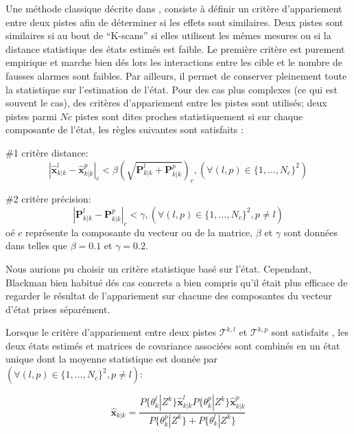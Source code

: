 \documentclass[10pt,french,a4paper]{report}
\begin{document}
Une méthode classique décrite dans \cite{Blackman1986}, consiste à définir un critère d'appariement entre deux pistes afin de déterminer si les effets sont similaires. Deux pistes sont similaires si au bout de ``K-scans'' si elles utilisent les mêmes mesures ou si la distance statistique des états estimés est faible. Le première critère est purement empirique et marche bien dés lors les interactions entre les cible et le nombre de fausses alarmes sont faibles. Par ailleurs, il permet de conserver pleinement toute la statistique sur l'estimation de l'état. Pour des cas plus complexes (ce qui est souvent le cas), des critères d'appariement entre les pistes sont utilisés; deux pistes parmi $Nc$ pistes sont dites proches statistiquement si sur chaque composante  de l'état, les règles suivantes sont satisfaits :
 
$\#$1 critère distance:
\begin{equation}  
 	  |\hat{\mathbf{x}}_{k|k}^l - \hat{\mathbf{x}}_{k|k}^p|_c< \beta ( \sqrt{\mathbf{P}_{k|k}^l + \mathbf{P}_{k|k}^p})_c, (\forall (l,p) \in \{1,\ldots,N_c\}^2)
\end{equation}

 $\#$2 critère précision:
\begin{equation}  
 |\mathbf{P}_{k|k}^l - \mathbf{P}_{k|k}^p|_c  < \gamma, (\forall (l,p) \in \{1,\ldots,N_c\}^2, p \neq l)
\end{equation}
oé $c$ représente la composante du vecteur ou de la matrice, $\beta$ et $\gamma$ sont données dans \cite{Blackman86} telles que $\beta = 0.1 $ et $\gamma = 0.2$. 

Nous aurions pu choisir un critère statistique basé sur l'état. Cependant, Blackman bien habitué dés cas concrets a bien compris qu'il était plus efficace de regarder le résultat de l'appariement sur chacune des composantes du vecteur d'état prises séparément.  
 
Lorsque le critère d'appariement entre deux pistes $\mathcal{T}^{k,l}$ et   $\mathcal{T}^{k,p}$  sont satisfaits , les deux états estimés et matrices de covariance associées sont combinés en un état unique dont la moyenne statistique est donnée par $(\forall (l,p) \in \{1,\ldots,N_c\}^2 , p \neq l)$:

\begin{equation}  
 	   \hat{\mathbf{x}}_{k|k}   = \frac{P\{\theta_k^l | Z^k\}  \hat{\mathbf{x}}_{k|k}^l P\{\theta_k^p | Z^k\}  \hat{\mathbf{x}}_{k|k}^p}{P\{\theta_k^p | Z^k\} + P\{\theta_k^l | Z^k\}}
\end{equation}
			 
\end{document}
